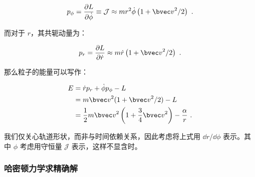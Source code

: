 $$p_\phi = \frac{\partial L}{\partial {\dot \phi}} \equiv \mathcal J \approx mr^2 \dot \phi \left( 1+ {\bvec v}^2/2 \right)~.$$

而对于 $r$，其共轭动量为：

$$p_r = \frac{\partial L}{\partial {\dot r}} \approx m \dot r \left( 1 + {\bvec v}^2/2 \right)~.$$

那么粒子的能量可以写作：

\begin{equation}
\begin{aligned}
E &= \dot r p_r + \dot \phi p_\phi - L \\
&= m {\bvec v}^2(1+{\bvec v}^2/2)-L \\
&= \frac{1}{2} m {\bvec v}^2 \left( 1 + \frac{3}{4} {\bvec v}^2 \right) - \frac{\alpha}{r} ~.
\end{aligned}
\end{equation}

我们仅关心轨道形状，而非与时间依赖关系，因此考虑将上式用 $\dd{r}/\dd{\phi}$ 表示。其中 $\phi$ 考虑用守恒量 $\mathcal J$ 表示，这样不显含时。

\subsubsection{哈密顿力学求精确解}
